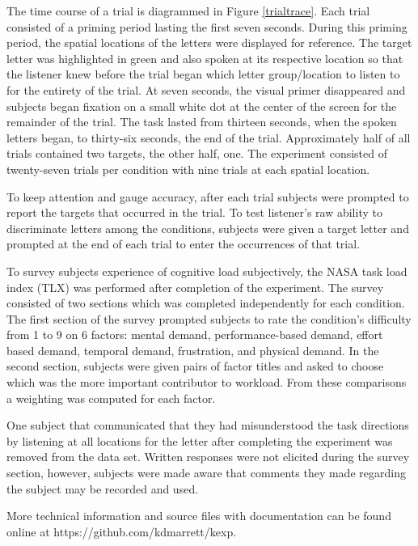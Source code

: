 \documentclass[10pt]{article}
\begin{document}
The time course of a trial is diagrammed in Figure \ref{trialtrace}.
Each trial consisted of a priming period lasting the first seven
seconds.  During this priming period, the spatial locations of the
letters were displayed for reference.  The target letter was
highlighted in green and also spoken at its respective location so
that the listener knew before the trial began which letter
group/location to listen to for the entirety of the trial. At seven
seconds, the visual primer disappeared and subjects began fixation on
a small white dot at the center of the screen for the remainder of
the trial.  The task lasted from thirteen seconds, when the spoken
letters began, to thirty-six seconds, the end of the trial.
Approximately half of all trials contained
two targets, the other half, one. The experiment consisted of
twenty-seven trials per condition with nine trials at each
spatial location.  

To keep attention and gauge accuracy, after each trial subjects
were prompted to report the targets that occurred in the trial. To test listener's raw ability
to discriminate letters among the conditions, subjects were given a
target letter and prompted at the end of each trial to enter the
occurrences of that trial.  

To survey subjects experience of cognitive load subjectively, the
NASA task load index (TLX) was performed after completion of the
experiment.  The survey consisted of two sections which was
completed independently for each condition.  The first section of
the survey prompted subjects to rate the condition's difficulty from
1 to 9 on 6 factors: mental demand, performance-based demand, effort
based demand, temporal demand, frustration, and physical demand. In
the second section, subjects were given pairs of factor titles and
asked to choose which was the more important contributor to
workload.  From these comparisons a weighting was computed for each
factor.  


One subject that communicated that they had 
misunderstood the task directions by listening at all locations for
the letter after completing the experiment
was removed from the data set. Written responses were not elicited
during the survey section, however, subjects were made aware that
comments they made regarding the subject may be recorded and used.

More technical information and source files with documentation can
be found online at https://github.com/kdmarrett/kexp.
\end{document}
